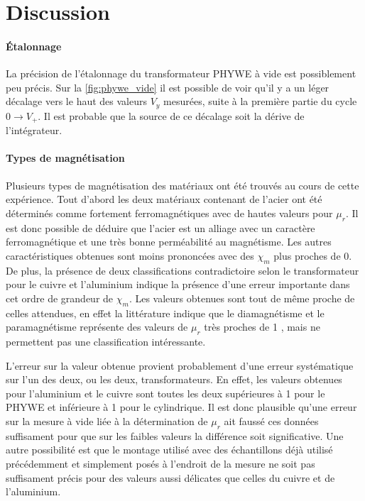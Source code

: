 \section{Discussion}

\paragraph*{Étalonnage}
La précision de l'étalonnage du transformateur PHYWE à vide est possiblement peu précis. Sur la \autoref{fig:phywe_vide} il est possible de voir qu'il y a un léger décalage vers le haut des valeurs \(V_y\) mesurées, suite à la première partie du cycle \(0 \rightarrow V_+\). Il est probable que la source de ce décalage soit la dérive de l'intégrateur.

\paragraph*{Types de magnétisation}
Plusieurs types de magnétisation des matériaux ont été trouvés au cours de cette expérience. Tout d'abord les deux matériaux contenant de l'acier ont été déterminés comme fortement ferromagnétiques avec de hautes valeurs pour \(\mu_r\). Il est donc possible de déduire que l'acier est un alliage avec un caractère ferromagnétique et une très bonne perméabilité au magnétisme. Les autres caractéristiques obtenues sont moins prononcées avec des \(\chi_m\) plus proches de 0. De plus, la présence de deux classifications contradictoire selon le transformateur pour le cuivre et l'aluminium indique la présence d'une erreur importante dans cet ordre de grandeur de \(\chi_m\). Les valeurs obtenues sont tout de même proche de celles attendues, en effet la littérature indique que le diamagnétisme et le paramagnétisme représente des valeurs de \(\mu_r\) très proches de 1 \cite{classification_litt}, mais ne permettent pas une classification intéressante.

L'erreur sur la valeur obtenue provient probablement d'une erreur systématique sur l'un des deux, ou les deux, transformateurs. En effet, les valeurs obtenues pour l'aluminium et le cuivre sont toutes les deux supérieures à 1 pour le PHYWE et inférieure à 1 pour le cylindrique. Il est donc plausible qu'une erreur sur la mesure à vide liée à la détermination de \(\mu_r\) ait faussé ces données suffisament pour que sur les faibles valeurs la différence soit significative. Une autre possibilité est que le montage utilisé avec des échantillons déjà utilisé précédemment et simplement posés à l'endroit de la mesure ne soit pas suffisament précis pour des valeurs aussi délicates que celles du cuivre et de l'aluminium.

